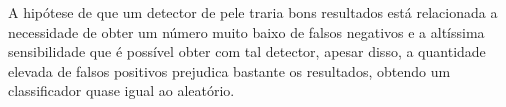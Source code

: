 A hipótese de que um detector de pele traria bons resultados está relacionada a necessidade de obter um número muito baixo de falsos negativos e a altíssima sensibilidade que é possível obter com tal detector, apesar disso, a quantidade elevada de falsos positivos prejudica bastante os resultados, obtendo um classificador quase igual ao aleatório.
